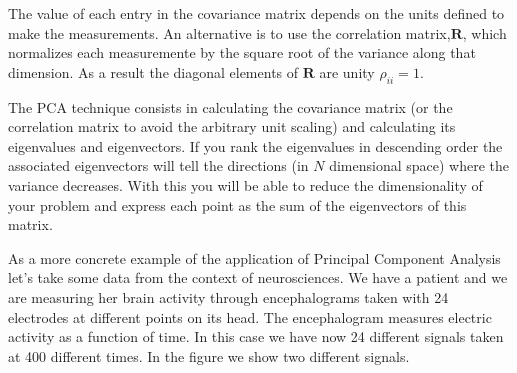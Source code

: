 \documentclass{article}
\begin{document}
The value of each entry in the covariance matrix depends on the units
defined to make the measurements. An alternative is to use the
correlation matrix,${\mathbf R}$, which normalizes each measuremente
by the square root of the variance along that dimension. As a result
the diagonal elements of ${\mathbf R}$ are unity $\rho_{ii}=1$.

The PCA technique consists in calculating the covariance matrix (or
the correlation matrix to avoid the arbitrary unit scaling) and
calculating its eigenvalues and eigenvectors. If you rank the
eigenvalues in descending order the associated eigenvectors will tell
the directions (in $N$ dimensional space) where the variance
decreases. With this you will be able to reduce the dimensionality of
your problem and express each point as the sum of the eigenvectors of
this matrix.

As a more concrete example of the application of Principal Component
Analysis let's take some data from the context of neurosciences. We
have a patient and we are measuring her brain activity through
encephalograms taken with 24 electrodes at different points on its
head. The encephalogram measures electric activity as a function of
time. In this case we have now 24 different signals taken at 400
different times. In the figure we show two different signals.
\end{document}
